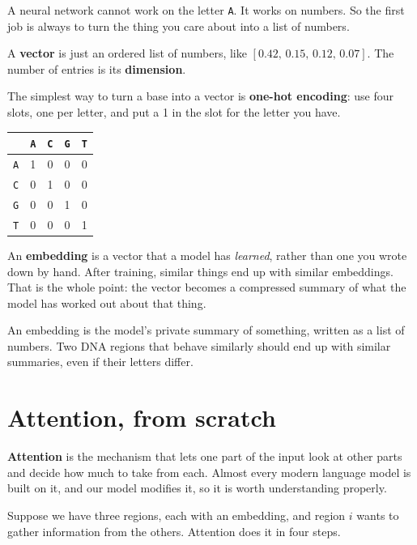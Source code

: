 \documentclass[11pt,a4paper]{article}
\newcommand{\term}[1]{\textcolor{deepblue}{\textbf{#1}}}
\newcommand{\code}[1]{\texttt{\small #1}}
\begin{document}
A neural network cannot work on the letter \code{A}. It works on numbers. So the
first job is always to turn the thing you care about into a list of numbers.

A \term{vector} is just an ordered list of numbers, like $[0.42,\, 0.15,\, 0.12,\,
0.07]$. The number of entries is its \term{dimension}.

The simplest way to turn a base into a vector is \term{one-hot encoding}: use four
slots, one per letter, and put a 1 in the slot for the letter you have.

\begin{center}
\begin{tabular}{c c c c c}
\toprule
 & \code{A} & \code{C} & \code{G} & \code{T}\\
\midrule
\code{A} & 1 & 0 & 0 & 0\\
\code{C} & 0 & 1 & 0 & 0\\
\code{G} & 0 & 0 & 1 & 0\\
\code{T} & 0 & 0 & 0 & 1\\
\bottomrule
\end{tabular}
\end{center}

An \term{embedding} is a vector that a model has \emph{learned}, rather than one you
wrote down by hand. After training, similar things end up with similar
embeddings. That is the whole point: the vector becomes a compressed summary of
what the model has worked out about that thing.

\begin{plainbox}
An embedding is the model's private summary of something, written as a list of
numbers. Two DNA regions that behave similarly should end up with similar
summaries, even if their letters differ.
\end{plainbox}

\section{Attention, from scratch}
\label{sec:attention}

\term{Attention} is the mechanism that lets one part of the input look at other
parts and decide how much to take from each. Almost every modern language model
is built on it, and our model modifies it, so it is worth understanding properly.

Suppose we have three regions, each with an embedding, and region $i$ wants to
gather information from the others. Attention does it in four steps.
\end{document}
